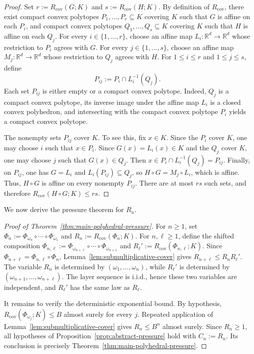 \documentclass[11pt]{amsart}
\numberwithin{equation}{section}
\theoremstyle{plain}
\theoremstyle{definition}
\theoremstyle{remark}
\begin{document}
\begin{proof}
Set \(r:=R_{\mathrm{cov}}(G;K)\) and \(s:=R_{\mathrm{cov}}(H;K)\). By definition of \(R_{\mathrm{cov}}\), there exist compact convex polytopes \(P_1,\dots,P_r\subseteq K\) covering \(K\) such that \(G\) is affine on each \(P_i\), and compact convex polytopes \(Q_1,\dots,Q_s\subseteq K\) covering \(K\) such that \(H\) is affine on each \(Q_j\).
For every \(i\in\{1,\dots,r\}\), choose an affine map \(L_i:\mathbb R^d\to\mathbb R^d\) whose restriction to \(P_i\) agrees with \(G\). For every \(j\in\{1,\dots,s\}\), choose an affine map \(M_j:\mathbb R^d\to\mathbb R^d\) whose restriction to \(Q_j\) agrees with \(H\). For \(1\le i\le r\) and \(1\le j\le s\), define
\[
P_{ij}:=P_i\cap L_i^{-1}(Q_j).
\]
Each set \(P_{ij}\) is either empty or a compact convex polytope. Indeed, \(Q_j\) is a compact convex polytope, its inverse image under the affine map \(L_i\) is a closed convex polyhedron, and intersecting with the compact convex polytope \(P_i\) yields a compact convex polytope.

The nonempty sets \(P_{ij}\) cover \(K\). To see this, fix \(x\in K\). Since the \(P_i\) cover \(K\), one may choose \(i\) such that \(x\in P_i\). Since \(G(x)=L_i(x)\in K\) and the \(Q_j\) cover \(K\), one may choose \(j\) such that \(G(x)\in Q_j\). Then \(x\in P_i\cap L_i^{-1}(Q_j)=P_{ij}\).
Finally, on \(P_{ij}\), one has \(G=L_i\) and \(L_i(P_{ij})\subseteq Q_j\), so \(H\circ G=M_j\circ L_i\), which is affine. Thus, \(H\circ G\) is affine on every nonempty \(P_{ij}\). There are at most \(rs\) such sets, and therefore \(R_{\mathrm{cov}}(H\circ G;K)\le rs\).
\end{proof}

We now derive the pressure theorem for \(R_n\).

\begin{proof}[Proof of Theorem~\ref{thm:main-polyhedral-pressure}]
For \(n\ge1\), set \(\Phi_n:=\Phi_{\omega_n}\circ\cdots\circ\Phi_{\omega_1}\) and \(R_n:=R_{\mathrm{cov}}(\Phi_n;K)\). For \(n,\ell\ge1\), define the shifted composition \(\Phi_{n,\ell}:=\Phi_{\omega_{n+\ell}}\circ\cdots\circ\Phi_{\omega_{n+1}}\) and \(R_\ell':=R_{\mathrm{cov}}(\Phi_{n,\ell};K)\). Since \(\Phi_{n+\ell}=\Phi_{n,\ell}\circ\Phi_n\), Lemma~\ref{lem:submultiplicative-cover} gives \(R_{n+\ell}\le R_nR_\ell'\).
The variable \(R_n\) is determined by \((\omega_1,\dots,\omega_n)\), while \(R_\ell'\) is determined by \((\omega_{n+1},\dots,\omega_{n+\ell})\). The layer sequence is i.i.d., hence these two variables are independent, and \(R_\ell'\) has the same law as \(R_\ell\).

It remains to verify the deterministic exponential bound. By hypothesis, \(R_{\mathrm{cov}}(\Phi_{\omega_j};K)\le B\) almost surely for every \(j\). Repeated application of Lemma~\ref{lem:submultiplicative-cover} gives \(R_n\le B^n\) almost surely. Since \(R_n\ge1\), all hypotheses of Proposition~\ref{prop:abstract-pressure} hold with \(C_n:=R_n\). Its conclusion is precisely Theorem~\ref{thm:main-polyhedral-pressure}.
\end{proof}
\end{document}

